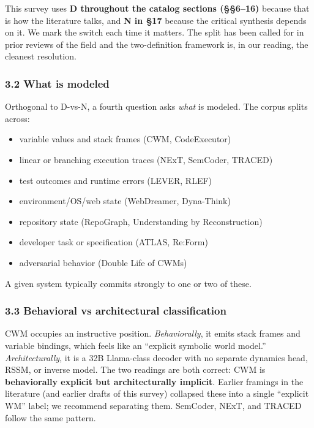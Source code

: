 \documentclass{article}
\providecommand{\tightlist}{\setlength{\itemsep}{0pt}\setlength{\parskip}{0pt}}
\begin{document}
This survey uses \textbf{D throughout the catalog sections (§§6--16)}
because that is how the literature talks, and \textbf{N in §17} because
the critical synthesis depends on it. We mark the switch each time it
matters. The split has been called for in prior reviews of the field and
the two-definition framework is, in our reading, the cleanest
resolution.

\hypertarget{what-is-modeled}{%
\subsubsection{3.2 What is modeled}\label{what-is-modeled}}

Orthogonal to D-vs-N, a fourth question asks \emph{what} is modeled. The
corpus splits across:

\begin{itemize}
\tightlist
\item
  variable values and stack frames (CWM, CodeExecutor)
\item
  linear or branching execution traces (NExT, SemCoder, TRACED)
\item
  test outcomes and runtime errors (LEVER, RLEF)
\item
  environment/OS/web state (WebDreamer, Dyna-Think)
\item
  repository state (RepoGraph, Understanding by Reconstruction)
\item
  developer task or specification (ATLAS, Re:Form)
\item
  adversarial behavior (Double Life of CWMs)
\end{itemize}

A given system typically commits strongly to one or two of these.

\hypertarget{behavioral-vs-architectural-classification}{%
\subsubsection{3.3 Behavioral vs architectural
classification}\label{behavioral-vs-architectural-classification}}

CWM occupies an instructive position. \emph{Behaviorally}, it emits
stack frames and variable bindings, which feels like an ``explicit
symbolic world model.'' \emph{Architecturally}, it is a 32B Llama-class
decoder with no separate dynamics head, RSSM, or inverse model. The two
readings are both correct: CWM is \textbf{behaviorally explicit but
architecturally implicit}. Earlier framings in the literature (and
earlier drafts of this survey) collapsed these into a single ``explicit
WM'' label; we recommend separating them. SemCoder, NExT, and TRACED
follow the same pattern.
\end{document}
